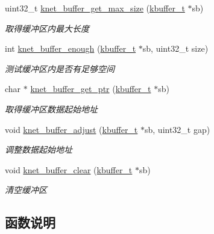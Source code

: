 \begin{DoxyCompactItemize}
uint32\+\_\+t \hyperlink{a00050_a8eee118becbc822b85b0459ece43b944_a8eee118becbc822b85b0459ece43b944}{knet\+\_\+buffer\+\_\+get\+\_\+max\+\_\+size} (\hyperlink{a00056_a4b09a7574cd440f9b94285ab73c81b4e_a4b09a7574cd440f9b94285ab73c81b4e}{kbuffer\+\_\+t} $\ast$sb)
\begin{DoxyCompactList}\small\item\em 取得缓冲区内最大长度 \end{DoxyCompactList}\item 
int \hyperlink{a00050_ab52a4b25cb665848167e2e3a57ad38f4_ab52a4b25cb665848167e2e3a57ad38f4}{knet\+\_\+buffer\+\_\+enough} (\hyperlink{a00056_a4b09a7574cd440f9b94285ab73c81b4e_a4b09a7574cd440f9b94285ab73c81b4e}{kbuffer\+\_\+t} $\ast$sb, uint32\+\_\+t size)
\begin{DoxyCompactList}\small\item\em 测试缓冲区内是否有足够空间 \end{DoxyCompactList}\item 
char $\ast$ \hyperlink{a00050_aad25b6a27ca6270b4cffb9c45daea697_aad25b6a27ca6270b4cffb9c45daea697}{knet\+\_\+buffer\+\_\+get\+\_\+ptr} (\hyperlink{a00056_a4b09a7574cd440f9b94285ab73c81b4e_a4b09a7574cd440f9b94285ab73c81b4e}{kbuffer\+\_\+t} $\ast$sb)
\begin{DoxyCompactList}\small\item\em 取得缓冲区数据起始地址 \end{DoxyCompactList}\item 
void \hyperlink{a00050_ace8a684108f818eab5d956235b0bce77_ace8a684108f818eab5d956235b0bce77}{knet\+\_\+buffer\+\_\+adjust} (\hyperlink{a00056_a4b09a7574cd440f9b94285ab73c81b4e_a4b09a7574cd440f9b94285ab73c81b4e}{kbuffer\+\_\+t} $\ast$sb, uint32\+\_\+t gap)
\begin{DoxyCompactList}\small\item\em 调整数据起始地址 \end{DoxyCompactList}\item 
void \hyperlink{a00050_ac787e1b4f944728f621d7f59b67eb0aa_ac787e1b4f944728f621d7f59b67eb0aa}{knet\+\_\+buffer\+\_\+clear} (\hyperlink{a00056_a4b09a7574cd440f9b94285ab73c81b4e_a4b09a7574cd440f9b94285ab73c81b4e}{kbuffer\+\_\+t} $\ast$sb)
\begin{DoxyCompactList}\small\item\em 清空缓冲区 \end{DoxyCompactList}\end{DoxyCompactItemize}


\subsection{函数说明}
\hypertarget{a00050_ace8a684108f818eab5d956235b0bce77_ace8a684108f818eab5d956235b0bce77}{}
